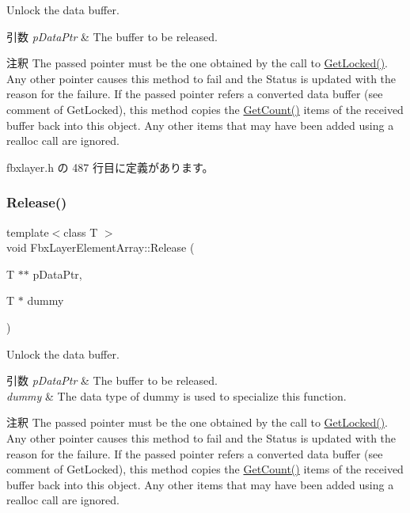 Unlock the data buffer. 
\begin{DoxyParams}{引数}
{\em p\+Data\+Ptr} & The buffer to be released. \\
\hline
\end{DoxyParams}
\begin{DoxyRemark}{注釈}
The passed pointer must be the one obtained by the call to \hyperlink{class_fbx_layer_element_array_a34ac50b866b0615109329c114e612b83}{Get\+Locked()}. Any other pointer causes this method to fail and the Status is updated with the reason for the failure. If the passed pointer refers a converted data buffer (see comment of Get\+Locked), this method copies the \hyperlink{class_fbx_layer_element_array_acd195095246f6d886d55fd0aa7129b2d}{Get\+Count()} items of the received buffer back into this object. Any other items that may have been added using a realloc call are ignored. 
\end{DoxyRemark}


 fbxlayer.\+h の 487 行目に定義があります。

\mbox{\label{class_fbx_layer_element_array_a1d83bb3361cec99c394596a6bee95bb2}} 
\subsubsection{\texorpdfstring{Release()}{Release()}\hspace{0.1cm}{\footnotesize\ttfamily [3/3]}}
{\footnotesize\ttfamily template$<$class T $>$ \\
void Fbx\+Layer\+Element\+Array\+::\+Release (\begin{DoxyParamCaption}\item[{T $\ast$$\ast$}]{p\+Data\+Ptr,  }\item[{T $\ast$}]{dummy }\end{DoxyParamCaption})\hspace{0.3cm}{\ttfamily [inline]}}

Unlock the data buffer. 
\begin{DoxyParams}{引数}
{\em p\+Data\+Ptr} & The buffer to be released. \\
\hline
{\em dummy} & The data type of dummy is used to specialize this function. \\
\hline
\end{DoxyParams}
\begin{DoxyRemark}{注釈}
The passed pointer must be the one obtained by the call to \hyperlink{class_fbx_layer_element_array_a34ac50b866b0615109329c114e612b83}{Get\+Locked()}. Any other pointer causes this method to fail and the Status is updated with the reason for the failure. If the passed pointer refers a converted data buffer (see comment of Get\+Locked), this method copies the \hyperlink{class_fbx_layer_element_array_acd195095246f6d886d55fd0aa7129b2d}{Get\+Count()} items of the received buffer back into this object. Any other items that may have been added using a realloc call are ignored. 
\end{DoxyRemark}


